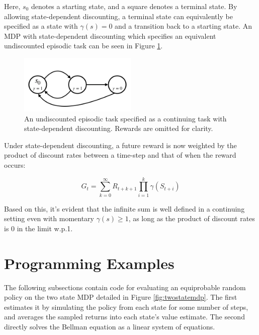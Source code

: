 \documentclass[twoside]{article}
\begin{document}
Here, $s_0$ denotes a starting state, and a square denotes a terminal state. By allowing state-dependent discounting, a terminal state can equivalently be specified as a state with $\gamma(s) = 0$ and a transition back to a starting state. An MDP with state-dependent discounting which specifies an equivalent undiscounted episodic task can be seen in Figure \ref{fig:mdp_continuing}.

\begin{figure}[H]
    \centering
    \includegraphics[width=0.5\textwidth]{mdp_continuing}
    \caption{An undiscounted episodic task specified as a continuing task with state-dependent discounting. Rewards are omitted for clarity.}
    \label{fig:mdp_continuing}
\end{figure}

Under state-dependent discounting, a future reward is now weighted by the product of discount rates between a time-step and that of when the reward occurs:

\begin{equation}
    G_t = \sum_{k=0}^{\infty}{R_{t+k+1}\prod_{i=1}^{k}{\gamma(S_{t+i})}}
    \label{eqn:prodreturn}
\end{equation}

Based on this, it's evident that the infinite sum is well defined in a continuing setting even with momentary $\gamma(s) \geq 1$, as long as the product of discount rates is 0 in the limit w.p.1.

\section{Programming Examples}

The following subsections contain code for evaluating an equiprobable random policy on the two state MDP detailed in Figure \ref{fig:twostatemdp}. The first estimates it by simulating the policy from each state for some number of steps, and averages the sampled returns into each state's value estimate. The second directly solves the Bellman equation as a linear system of equations.
\end{document}
